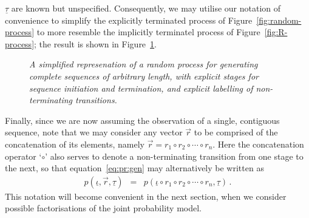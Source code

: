 \documentclass[a4paper]{article}
\newcommand{\ui}{\underline{\iota}}
\newcommand{\ut}{\underline{\tau}}
\begin{document}
$\ut$ are known but unspecified.
Consequently, we may utilise our notation of convenience to simplify the explicitly terminated process of Figure~\ref{fig:random-process} 
to more resemble the implicitly terminatel process of Figure~\ref{fig:R-process}; the result is shown in Figure~\ref{fig:simple-random-process}.
\begin{figure}[hbt]
\centering
{}
\caption{\em A simplified represenation of a random process for generating complete sequences of arbitrary length,
with explicit stages for sequence initiation and termination, and explicit labelling of non-terminating transitions.}
\label{fig:simple-random-process}
\end{figure}

Finally, since we are now assuming the observation of a single, contiguous sequence, note that we may consider any vector $\vec{r}$ 
to be comprised of the concatenation of its elements, namely $\vec{r}=r_1\circ r_2\circ\cdots\circ r_n$. Here the concatenation operator `$\circ$' also serves to
denote a non-terminating transition from one stage to the next, so that equation~\eqref{eq:pr:gen} may alternatively be written as
\begin{eqnarray}
p(\ui,\vec{r},\ut)
& = & p(\ui\circ r_1\circ r_2\circ\cdots\circ r_n,\ut)\,.
\end{eqnarray}
This notation will become convenient in the next section, when we consider possible factorisations of the joint probability model.

\end{document}
